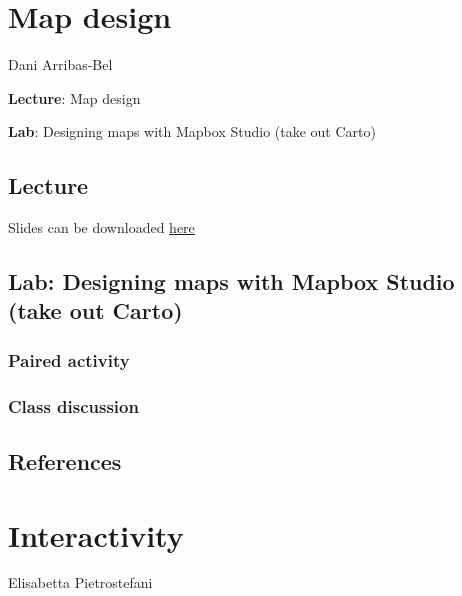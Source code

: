 \documentclass[
  letterpaper,
  DIV=11,
  numbers=noendperiod]{scrreprt}
\begin{document}

\hypertarget{map-design}{%
\chapter{Map design}\label{map-design}}

Dani Arribas-Bel

\textbf{Lecture}: Map design

\textbf{Lab}: Designing maps with Mapbox Studio (take out Carto)

\hypertarget{lecture-4}{%
\section{Lecture}\label{lecture-4}}

Slides can be downloaded
\href{https://github.com/GDSL-UL/wma/raw/main/pdf/lecture_06.pdf}{here}

\hypertarget{lab-designing-maps-with-mapbox-studio-take-out-carto}{%
\section{Lab: Designing maps with Mapbox Studio (take out
Carto)}\label{lab-designing-maps-with-mapbox-studio-take-out-carto}}

\hypertarget{paired-activity-3}{%
\subsection{Paired activity}\label{paired-activity-3}}

\hypertarget{class-discussion-3}{%
\subsection{Class discussion}\label{class-discussion-3}}

\hypertarget{references-4}{%
\section{References}\label{references-4}}


\hypertarget{interactivity}{%
\chapter{Interactivity}\label{interactivity}}

Elisabetta Pietrostefani
\end{document}
